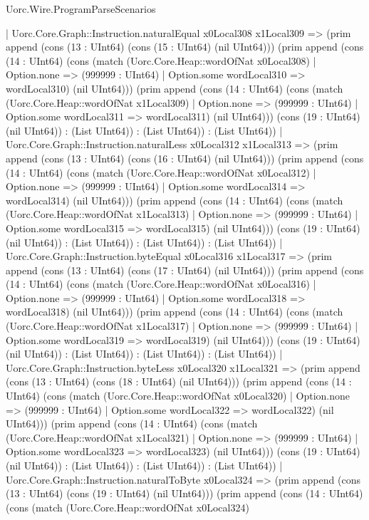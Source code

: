 \begin{lexlean}{Uorc.Wire.ProgramParseScenarios}
\begin{semanticmodule}
{    | Uorc.Core.Graph::Instruction.naturalEqual x0Local308 x1Local309 => (prim append (cons (13 : UInt64) (cons (15 : UInt64) (nil UInt64))) (prim append (cons (14 : UInt64) (cons (match (Uorc.Core.Heap::wordOfNat x0Local308)
      | Option.none => (999999 : UInt64)
      | Option.some wordLocal310 => wordLocal310) (nil UInt64))) (prim append (cons (14 : UInt64) (cons (match (Uorc.Core.Heap::wordOfNat x1Local309)
      | Option.none => (999999 : UInt64)
      | Option.some wordLocal311 => wordLocal311) (nil UInt64))) (cons (19 : UInt64) (nil UInt64)) : (List UInt64)) : (List UInt64)) : (List UInt64))
    | Uorc.Core.Graph::Instruction.naturalLess x0Local312 x1Local313 => (prim append (cons (13 : UInt64) (cons (16 : UInt64) (nil UInt64))) (prim append (cons (14 : UInt64) (cons (match (Uorc.Core.Heap::wordOfNat x0Local312)
      | Option.none => (999999 : UInt64)
      | Option.some wordLocal314 => wordLocal314) (nil UInt64))) (prim append (cons (14 : UInt64) (cons (match (Uorc.Core.Heap::wordOfNat x1Local313)
      | Option.none => (999999 : UInt64)
      | Option.some wordLocal315 => wordLocal315) (nil UInt64))) (cons (19 : UInt64) (nil UInt64)) : (List UInt64)) : (List UInt64)) : (List UInt64))
    | Uorc.Core.Graph::Instruction.byteEqual x0Local316 x1Local317 => (prim append (cons (13 : UInt64) (cons (17 : UInt64) (nil UInt64))) (prim append (cons (14 : UInt64) (cons (match (Uorc.Core.Heap::wordOfNat x0Local316)
      | Option.none => (999999 : UInt64)
      | Option.some wordLocal318 => wordLocal318) (nil UInt64))) (prim append (cons (14 : UInt64) (cons (match (Uorc.Core.Heap::wordOfNat x1Local317)
      | Option.none => (999999 : UInt64)
      | Option.some wordLocal319 => wordLocal319) (nil UInt64))) (cons (19 : UInt64) (nil UInt64)) : (List UInt64)) : (List UInt64)) : (List UInt64))
    | Uorc.Core.Graph::Instruction.byteLess x0Local320 x1Local321 => (prim append (cons (13 : UInt64) (cons (18 : UInt64) (nil UInt64))) (prim append (cons (14 : UInt64) (cons (match (Uorc.Core.Heap::wordOfNat x0Local320)
      | Option.none => (999999 : UInt64)
      | Option.some wordLocal322 => wordLocal322) (nil UInt64))) (prim append (cons (14 : UInt64) (cons (match (Uorc.Core.Heap::wordOfNat x1Local321)
      | Option.none => (999999 : UInt64)
      | Option.some wordLocal323 => wordLocal323) (nil UInt64))) (cons (19 : UInt64) (nil UInt64)) : (List UInt64)) : (List UInt64)) : (List UInt64))
    | Uorc.Core.Graph::Instruction.naturalToByte x0Local324 => (prim append (cons (13 : UInt64) (cons (19 : UInt64) (nil UInt64))) (prim append (cons (14 : UInt64) (cons (match (Uorc.Core.Heap::wordOfNat x0Local324)
}
\end{semanticmodule}
\end{lexlean}
